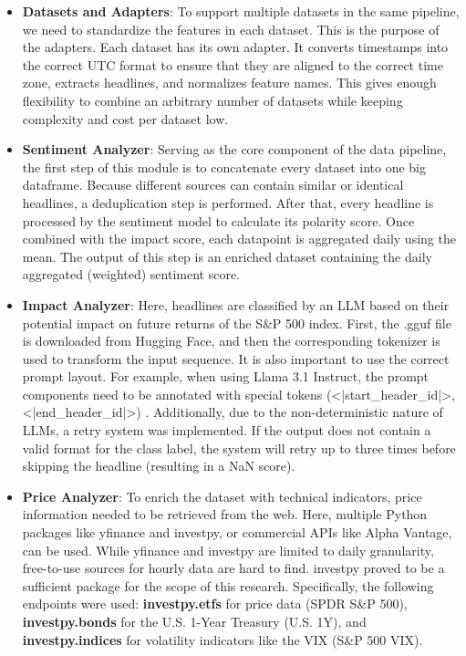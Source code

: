 \documentclass[Master,english,IEEE]{twbook}
\begin{document}
\begin{itemize}
    \item \textbf{Datasets and Adapters}: To support multiple datasets in the same pipeline, we need to standardize the features in each dataset. This is the purpose of the adapters. Each dataset has its own adapter. It converts timestamps into the correct UTC format to ensure that they are aligned to the correct time zone, extracts headlines, and normalizes feature names. This gives enough flexibility to combine an arbitrary number of datasets while keeping complexity and cost per dataset low.
    \item \textbf{Sentiment Analyzer}: Serving as the core component of the data pipeline, the first step of this module is to concatenate every dataset into one big dataframe. Because different sources can contain similar or identical headlines, a deduplication step is performed. After that, every headline is processed by the sentiment model to calculate its polarity score. Once combined with the impact score, each datapoint is aggregated daily using the mean. The output of this step is an enriched dataset containing the daily aggregated (weighted) sentiment score.
    \item \textbf{Impact Analyzer}: Here, headlines are classified by an LLM based on their potential impact on future returns of the S\&P 500 index. First, the .gguf file is downloaded from Hugging Face, and then the corresponding tokenizer is used to transform the input sequence. It is also important to use the correct prompt layout. For example, when using Llama 3.1 Instruct, the prompt components need to be annotated with special tokens (<|start\_header\_id|>, <|end\_header\_id|>) \cite{meta_llama31_2024}. Additionally, due to the non-deterministic nature of LLMs, a retry system was implemented. If the output does not contain a valid format for the class label, the system will retry up to three times before skipping the headline (resulting in a NaN score).
    \item \textbf{Price Analyzer}: To enrich the dataset with technical indicators, price information needed to be retrieved from the web. Here, multiple Python packages like yfinance and investpy, or commercial APIs like Alpha Vantage, can be used. While yfinance and investpy are limited to daily granularity, free-to-use sources for hourly data are hard to find. investpy proved to be a sufficient package for the scope of this research. Specifically, the following endpoints were used: \textbf{investpy.etfs} for price data (SPDR S\&P 500), \textbf{investpy.bonds} for the U.S. 1-Year Treasury (U.S. 1Y), and \textbf{investpy.indices} for volatility indicators like the VIX (S\&P 500 VIX).

\end{itemize}
\end{document}
